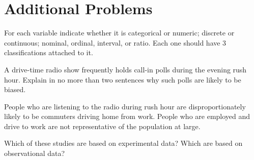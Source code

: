 \documentclass[addpoints,12pt]{exam}
\begin{document}
\section*{Additional Problems}
\begin{questions}

\question For each variable indicate whether it is categorical or numeric; discrete or continuous; nominal, ordinal, interval, or ratio. Each one should have 3 classifications attached to it.
	
\question A drive-time radio show frequently holds call-in polls during the evening rush hour. Explain in no more than two sentences why such polls are likely to be biased.
	\begin{solution}
		People who are listening to the radio during rush hour are disproportionately likely to be commuters driving home from work. People who are employed and drive to work are not representative of the population at large.  
	\end{solution}

	
\question Which of these studies are based on experimental data? Which are based on observational data?
	\begin{parts}

\end{parts}
\end{questions}
\end{document}
